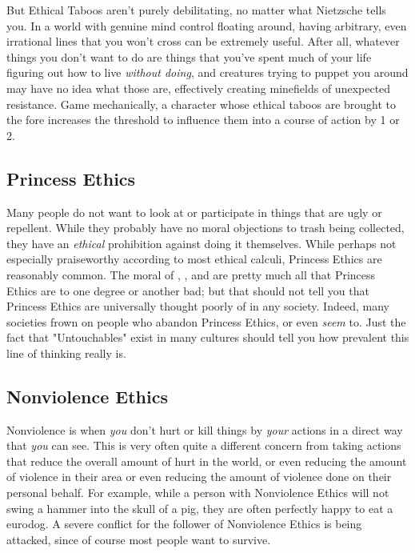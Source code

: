 But Ethical Taboos aren't purely debilitating, no matter what Nietzsche tells you. In a world with genuine mind control floating around, having arbitrary, even irrational lines that you won't cross can be extremely useful. After all, whatever things you don't want to do are things that you've spent much of your life figuring out how to live \textit{without doing}, and creatures trying to puppet you around may have no idea what those are, effectively creating minefields of unexpected resistance. Game mechanically, a character whose ethical taboos are brought to the fore increases the threshold to influence them into a course of action by 1 or 2.

\subsection{Princess Ethics}

Many people do not want to look at or participate in things that are ugly or repellent. While they probably have no moral objections to trash being collected, they have an \textit{ethical} prohibition against doing it themselves. While perhaps not especially praiseworthy according to most ethical calculi, Princess Ethics are reasonably common. The moral of , , and  are pretty much all that Princess Ethics are to one degree or another bad; but that should not tell you that Princess Ethics are universally thought poorly of in any society. Indeed, many societies frown on people who abandon Princess Ethics, or even \textit{seem} to. Just the fact that "Untouchables" exist in many cultures should tell you how prevalent this line of thinking really is.

\subsection{Nonviolence Ethics}

Nonviolence is when \textit{you} don't hurt or kill things by \textit{your} actions in a direct way that \textit{you} can see. This is very often quite a different concern from taking actions that reduce the overall amount of hurt in the world, or even reducing the amount of violence in their area or even reducing the amount of violence done on their personal behalf. For example, while a person with Nonviolence Ethics will not swing a hammer into the skull of a pig, they are often perfectly happy to eat a eurodog. A severe conflict for the follower of Nonviolence Ethics is being attacked, since of course most people want to survive.

